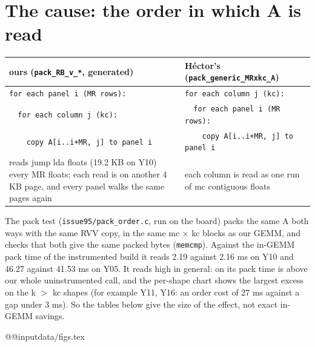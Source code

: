 \documentclass[10pt,a4paper]{article}
\newcommand{\D}{data}
\begin{document}
\section{The cause: the order in which A is read}
\begin{center}\small
\begin{tabular}{@{}p{7.6cm} p{7.6cm}@{}}
\toprule
ours (\texttt{pack\_RB\_v\_*}, generated) & H\'ector's (\texttt{pack\_generic\_MRxkc\_A}) \\
\midrule
\texttt{for each panel i (MR rows):} & \texttt{for each column j (kc):} \\
\texttt{\ \ for each column j (kc):} & \texttt{\ \ for each panel i (MR rows):} \\
\texttt{\ \ \ \ copy A[i..i+MR, j] to panel i} & \texttt{\ \ \ \ copy A[i..i+MR, j] to panel i} \\
\midrule
reads jump lda floats (19.2 KB on Y10) every MR floats; each read is on another 4 KB page, and every panel walks the same pages again & each column is read as one run of mc contiguous floats \\
\bottomrule
\end{tabular}
\end{center}
The pack test (\texttt{issue95/pack\_order.c}, run on the board) packs the same A both ways with the same RVV copy, in the same mc $\times$ kc blocks as our GEMM, and checks that both give the same packed bytes (\texttt{memcmp}). Against the in-GEMM pack time of the instrumented build it reads 2.19 against 2.16 ms on Y10 and 46.27 against 41.53 ms on Y05. It reads high in general: on  its pack time is above our whole uninstrumented call, and the per-shape chart shows the largest excess on the k $>$ kc shapes (for example Y11, Y16: an order cost of 27 ms against a gap under 3 ms). So the tables below give the size of the effect, not exact in-GEMM savings.

\csname @@input\endcsname \D/figs.tex
\end{document}
